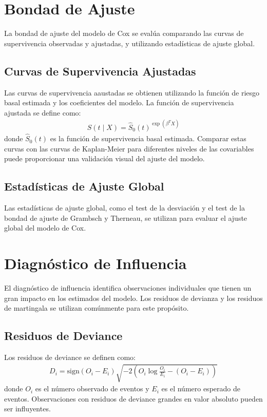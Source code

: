 \documentclass[a4paper]{report} %
\begin{document}
\section{Bondad de Ajuste}
La bondad de ajuste del modelo de Cox se eval\'ua comparando las curvas de supervivencia observadas y ajustadas, y utilizando estad\'isticas de ajuste global.

\subsection{Curvas de Supervivencia Ajustadas}
Las curvas de supervivencia aaustadas se obtienen utilizando la funci\'on de riesgo basal estimada y los coeficientes del modelo. La funci\'on de supervivencia ajustada se define como:
\begin{eqnarray*}
\hat{S}(t \mid X) = \hat{S}_0(t)^{\exp(\beta^T X)}
\end{eqnarray*}
donde $\hat{S}_0(t)$ es la funci\'on de supervivencia basal estimada. Comparar estas curvas con las curvas de Kaplan-Meier para diferentes niveles de las covariables puede proporcionar una validaci\'on visual del ajuste del modelo.

\subsection{Estad\'isticas de Ajuste Global}
Las estad\'isticas de ajuste global, como el test de la desviaci\'on y el test de la bondad de ajuste de Grambsch y Therneau, se utilizan para evaluar el ajuste global del modelo de Cox.

\section{Diagn\'ostico de Influencia}
El diagn\'ostico de influencia identifica observaciones individuales que tienen un gran impacto en los estimados del modelo. Los residuos de devianza y los residuos de martingala se utilizan com\'unmente para este prop\'osito.

\subsection{Residuos de Deviance}
Los residuos de deviance se definen como:
\begin{eqnarray*}
D_i = \text{sign}(O_i - E_i) \sqrt{-2 \left(O_i \log \frac{O_i}{E_i} - (O_i - E_i)\right)}
\end{eqnarray*}
donde $O_i$ es el n\'umero observado de eventos y $E_i$ es el n\'umero esperado de eventos. Observaciones con residuos de deviance grandes en valor absoluto pueden ser influyentes.
\end{document}
